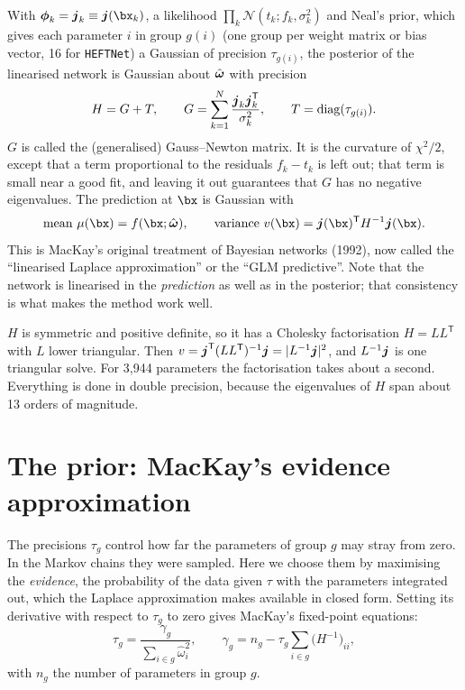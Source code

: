 With $\boldsymbol{\phi}_k = \bj_k \equiv \bj(\bx_k)$, a likelihood
$\prod_k \mathcal{N}(t_k; f_k, \sigma_k^2)$ and Neal's prior, which gives each parameter
$i$ in group $g(i)$ (one group per weight matrix or bias vector, 16 for \texttt{HEFTNet}) a
Gaussian of precision $\tau_{g(i)}$, the posterior of the linearised network is Gaussian
about $\hat{\boldsymbol{\omega}}$ with precision
\begin{equation}
  H = G + T, \qquad
  G = \sum_{k=1}^{N} \frac{\boldsymbol{j}_k \boldsymbol{j}_k^{\mathsf T}}{\sigma_k^2}, \qquad
  T = \mathrm{diag}(\tau_{g(i)}) .
  \label{eq:H}
\end{equation}
$G$ is called the (generalised) Gauss--Newton matrix. It is the curvature of $\chi^2/2$,
except that a term proportional to the residuals $f_k - t_k$ is left out; that term is
small near a good fit, and leaving it out guarantees that $G$ has no negative eigenvalues.
The prediction at $\bx$ is Gaussian with
\begin{equation}
  \text{mean } \mu(\bx) = f(\bx;\what), \qquad
  \text{variance } v(\bx) = \bj(\bx)^{\mathsf T} H^{-1} \bj(\bx) .
  \label{eq:pred}
\end{equation}
This is MacKay's original treatment of Bayesian networks (1992), now called the
``linearised Laplace approximation'' or the ``GLM predictive''. Note that the network is
linearised in the \emph{prediction} as well as in the posterior; that consistency is what
makes the method work well.

\begin{aside}
$H$ is symmetric and positive definite, so it has a Cholesky factorisation $H = LL^{\mathsf T}$
with $L$ lower triangular. Then $v = \boldsymbol{j}^{\mathsf T}(LL^{\mathsf T})^{-1}\boldsymbol{j} = |L^{-1}\boldsymbol{j}|^2$,
and $L^{-1}\boldsymbol{j}$ is one triangular solve. For 3,944 parameters the factorisation takes
about a second. Everything is done in double precision, because the eigenvalues of $H$ span
about 13 orders of magnitude.
\end{aside}

\section{The prior: MacKay's evidence approximation}
\label{sec:prior}

The precisions $\tau_g$ control how far the parameters of group $g$ may stray from zero. In
the Markov chains they were sampled. Here we choose them by maximising the
\emph{evidence}, the probability of the data given $\tau$ with the parameters integrated
out, which the Laplace approximation makes available in closed form. Setting its
derivative with respect to $\tau_g$ to zero gives MacKay's fixed-point equations:
\begin{equation}
  \tau_g = \frac{\gamma_g}{\sum_{i\in g}\hat\omega_i^2}, \qquad
  \gamma_g = n_g - \tau_g \sum_{i\in g} \big(H^{-1}\big)_{ii} ,
  \label{eq:mackay}
\end{equation}
with $n_g$ the number of parameters in group $g$.

